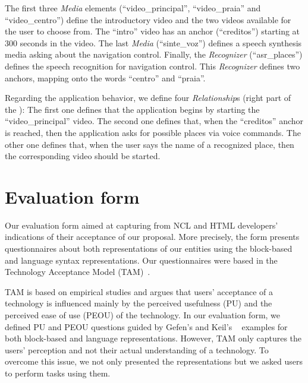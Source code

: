 The first three \textit{Media} elements (“video\_principal”, “video\_praia” and
“video\_centro”) define the introductory video and the two videos available for
the user to choose from. The
“intro” video has an anchor (“creditos”) starting at 300 seconds in the video.
The last \textit{Media} (“sinte\_voz”) defines a speech synthesis media asking about the
navigation control. Finally, the \textit{Recognizer} (“asr\_places”) defines the
speech recognition for navigation control. This \textit{Recognizer} defines two
anchors, mapping onto the words “centro” and “praia”.

Regarding the application behavior, we define four \textit{Relationship}s (right
part of the ): The first one defines that the application
begins by starting the “video\_principal” video. The second one defines that,
when the “creditos” anchor is reached, then the application asks for possible
places via voice commands. The other one defines that, when the user says the
name of a recognized place, then the corresponding video should be started.

\section{Evaluation form}
\label{sec:evaluation:form}

Our evaluation form aimed at capturing from NCL and HTML developers’ indications
of their acceptance of our proposal. More precisely, the form presents
questionnaires about both representations of our entities using the block-based
and language syntax representations. Our questionnaires were based in the
Technology Acceptance Model (TAM)~\cite{davis_perceived_1989}.

TAM is based on empirical studies and argues that users’ acceptance of a
technology is influenced mainly by the perceived usefulness (PU) and the
perceived ease of use (PEOU) of the technology. In our evaluation form, we
defined PU and PEOU questions guided by Gefen’s and Keil’s
~\cite{gefen_impact_1998} examples for both block-based and language
representations. However, TAM only captures the users’ perception and not their
actual understanding of a technology. To overcome this issue, we not only
presented the representations but we asked users to perform tasks using them.

